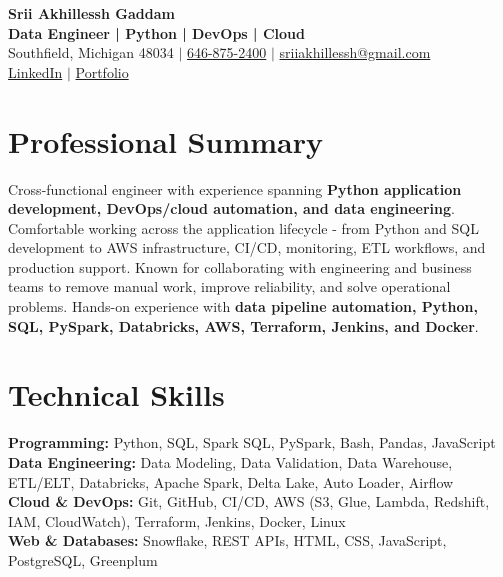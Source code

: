 \documentclass[letterpaper,10pt]{article}
\begin{document}
\fontsize{9.35pt}{10.45pt}\selectfont

\begin{center}
    {\LARGE \textbf{Srii Akhillessh Gaddam}} \\[-1pt]
    \textbf{Data Engineer | Python | DevOps | Cloud} \\[2pt]
    Southfield, Michigan 48034 $|$
    \href{tel:6468752400}{646-875-2400} $|$
    \href{mailto:sriiakhillessh@gmail.com}{sriiakhillessh@gmail.com} \\[1pt]
    \href{https://www.linkedin.com/in/srii-akhiilessh-gaddam-b48668191/}{LinkedIn} $|$
    \href{https://sriiakhillesshg.github.io/portfolio/}{Portfolio}
\end{center}
\vspace{-8pt}

\section{Professional Summary}
\small{Cross-functional engineer with experience spanning \textbf{Python application development, DevOps/cloud automation, and data engineering}. Comfortable working across the application lifecycle - from Python and SQL development to AWS infrastructure, CI/CD, monitoring, ETL workflows, and production support. Known for collaborating with engineering and business teams to remove manual work, improve reliability, and solve operational problems. Hands-on experience with \textbf{data pipeline automation, Python, SQL, PySpark, Databricks, AWS, Terraform, Jenkins, and Docker}.}

\section{Technical Skills}
\small{
\textbf{Programming:} Python, SQL, Spark SQL, PySpark, Bash, Pandas, JavaScript \\
\textbf{Data Engineering:} Data Modeling, Data Validation, Data Warehouse, ETL/ELT, Databricks, Apache Spark, Delta Lake, Auto Loader, Airflow \\
\textbf{Cloud \& DevOps:} Git, GitHub, CI/CD, AWS (S3, Glue, Lambda, Redshift, IAM, CloudWatch), Terraform, Jenkins, Docker, Linux \\
\textbf{Web \& Databases:} Snowflake, REST APIs, HTML, CSS, JavaScript, PostgreSQL, Greenplum
}
\end{document}
